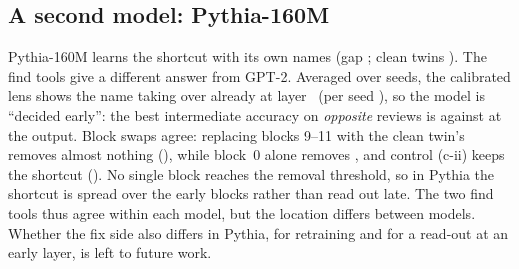 \subsection{A second model: Pythia-160M}
\label{sec:pythia}
Pythia-160M learns the shortcut with its own names (gap \gapPythia; clean twins \gapPythiaClean). The find tools give a
different answer from GPT-2. Averaged over seeds, the calibrated lens shows the name taking over already at
layer~\pyTakeoverMeanPythia{} (per seed \pyTakeoverPythia), so the model is ``decided early'': the best intermediate
accuracy on \emph{opposite} reviews is \pyBestMidOppMeanPythia{} against \pyFinalOppMeanPythia{} at the output. Block
swaps agree: replacing blocks 9--11 with the clean twin's removes almost nothing (\pySwapRemovedLatePythia), while
block~0 alone removes \pySwapRemovedBZeroPythia, and control (c-ii) keeps the shortcut (\pySwapCiiKeptLatePythia). No
single block reaches the removal threshold, so in Pythia the shortcut is spread over the early blocks rather than read
out late. The two find tools thus agree within each model, but the location differs between models. Whether the fix side
also differs in Pythia, for retraining and for a read-out at an early layer, is left to future work.
